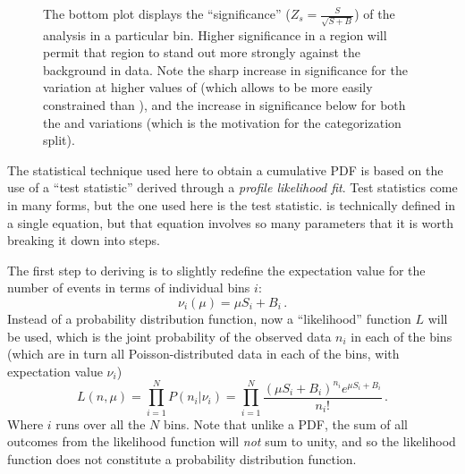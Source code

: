 \begin{figure}
{            The bottom plot displays the ``significance'' ($Z_s=\frac{S}{\sqrt{S+B}}$)
                of the analysis in a particular bin.
            Higher significance in a region will permit that region to stand out more strongly against the background in data.
            Note the sharp increase in significance for the \kvv variation at higher values of \mhh
                (which allows \kvv to be more easily constrained than \kl),
                and the increase in significance below  for both the \kvv and \kl variations
                (which is the motivation for the \deta categorization split).
        }
        \label{fig:data_dump}
    \end{figure}

    
    The statistical technique used here to obtain a cumulative PDF
        is based on the use of a ``test statistic'' derived through a \textit{profile likelihood fit}.
    Test statistics come in many forms, but the one used here is the \qtil test statistic\cite{asymptotic_formulae_for_likelihood}.
    \qtil is technically defined in a single equation,
        but that equation involves so many parameters that it is worth breaking it down into steps.


    The first step to deriving \qtil is to slightly redefine the expectation value for the number of events 
        in terms of individual bins $i$:
    \begin{equation}
        \nu_i(\mu) = \mu S_i + B_i
        \,.
    \end{equation}
    Instead of a probability distribution function, now a ``likelihood'' function $L$ will be used,
        which is the joint probability of the observed data $n_i$ in each of the bins
        (which are in turn all Poisson-distributed data in each of the bins, with expectation value $\nu_i$)
    \begin{equation}
        L(n,\mu) = \prod \limits_{i=1}^{N} P(n_i | \nu_i)
            = \prod \limits_{i=1}^{N} \frac{ (\mu S_i + B_i)^{n_i} e^{\mu S_i + B_i} }{n_i!}
        \,.
    \end{equation}
    Where $i$ runs over all the $N$ bins.
    Note that unlike a PDF, the sum of all outcomes from the likelihood function will \textit{not} sum to unity,
        and so the likelihood function does not constitute a probability distribution function\cite{cousins2020likelihood}.

